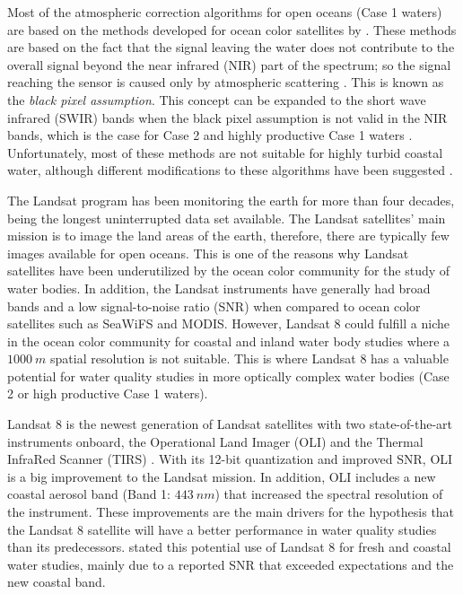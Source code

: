 \documentclass[onecolumn,3p,letterpaper]{elsarticle}
\begin{document}
Most of the atmospheric correction algorithms for open oceans (Case 1 waters) are based on the methods developed for ocean color satellites by \citet{Gordon:1997}. These methods are based on the fact that the signal leaving the water does not contribute to the overall signal beyond the near infrared (NIR) part of the spectrum; so the signal reaching the sensor is caused only by atmospheric scattering \citep{Gordon:1994}. This is known as the {\it black pixel assumption}. This concept can be expanded to the short wave infrared (SWIR) bands when the black pixel assumption is not valid in the NIR bands, which is the case for Case 2 and highly productive Case 1 waters \citep{Wang:2007}. Unfortunately, most of these methods are not suitable for highly turbid coastal water, although different modifications to these algorithms have been suggested \citep{Patt2003}.

The Landsat program has been monitoring the earth for more than four decades, being the longest uninterrupted data set available. The Landsat satellites' main mission is to image the land areas of the earth, therefore, there are typically few images available for open oceans. This is one of the reasons why Landsat satellites have been underutilized by the ocean color community for the study of water bodies. In addition, the Landsat instruments have generally had broad bands and a low signal-to-noise ratio (SNR) when compared to ocean color satellites such as SeaWiFS and MODIS. However, Landsat 8 could fulfill a niche in the ocean color community for coastal and inland water body studies where a $1000~m$ spatial resolution is not suitable. This is where Landsat 8 has a valuable potential for water quality studies in more optically complex water bodies (Case 2 or high productive Case 1 waters). 

Landsat 8 is the newest generation of Landsat satellites with two state-of-the-art instruments onboard, the Operational Land Imager (OLI) and the Thermal InfraRed Scanner (TIRS) \citep{Irons:2012}. With its 12-bit quantization and improved SNR, OLI is a big improvement to the Landsat mission. In addition, OLI includes a new coastal aerosol band (Band 1: $443~nm$) that increased the spectral resolution of the instrument. These improvements are the main drivers for the hypothesis that the Landsat 8 satellite will have a better performance in water quality studies than its predecessors. \citet{Roy:2014} stated this potential use of Landsat 8 for fresh and coastal water studies, mainly due to a reported SNR that exceeded expectations and the new coastal band. 
\end{document}
